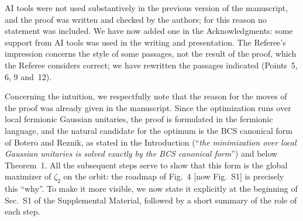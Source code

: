\documentclass[11pt]{article}
\newcommand{\reply}[1]{{\color{black}#1}}
\begin{document}
\reply{
AI tools were not used substantively in the previous version of the manuscript, and the proof was written and checked by the authors; for this reason no statement was included. We have now added one in the Acknowledgments: some support from AI tools was used in the writing and presentation. The Referee's impression concerns the style of some passages, not the result of the proof, which the Referee considers correct; we have rewritten the passages indicated (Points~5, 6, 9 and~12).

\medskip
\noindent
Concerning the intuition, we respectfully note that the reason for the moves of the proof was already given in the manuscript. Since the optimization runs over local fermionic Gaussian unitaries, the proof is formulated in the fermionic language, and the natural candidate for the optimum is the BCS canonical form of Botero and Reznik, as stated in the Introduction (``\textit{the minimization over local Gaussian unitaries is solved exactly by the BCS canonical form}'') and below Theorem~1. All the subsequent steps serve to show that this form is the global maximizer of $\zeta_2$ on the orbit: the roadmap of Fig.~4 [now Fig.~S1] is precisely this ``why''. To make it more visible, we now state it explicitly at the beginning of Sec.~S1 of the Supplemental Material, followed by a short summary of the role of each step.
}

\vspace{0.4cm}

\begin{quote}
\end{quote}
\end{document}
